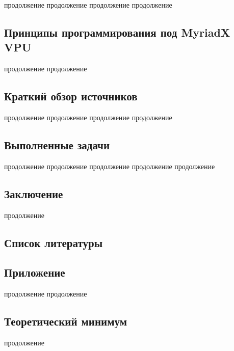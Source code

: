 \documentclass{article}
\begin{document}
    \newpage
    продолжение
    \newpage
    продолжение
    \newpage
    продолжение
    \newpage
    продолжение
    
    \newpage
    \begin{center} 
    \section{Принципы программирования под MyriadX VPU}
    \end{center}
    
    \newpage
    продолжение
    \newpage
    продолжение
    
    \newpage
    \begin{center} 
    \section{Краткий обзор источников}
    \end{center}
    
    \newpage
    продолжение
    \newpage
    продолжение
    \newpage
    продолжение
    \newpage
    продолжение
    
    \newpage
    \begin{center} 
    \section{Выполненные задачи}
    \end{center}
    
    \newpage
    продолжение
    \newpage
    продолжение
    \newpage
    продолжение
    \newpage
    продолжение
    \newpage
    продолжение
    
    \newpage
    \begin{center} 
    \section{Заключение}
    \end{center}
    
    \newpage
    продолжение
    
    \newpage
    \begin{center} 
    \section{Список литературы}
    \end{center}
    
    \newpage
    \begin{center} 
    \section{Приложение}
    \end{center}
    
    \newpage
    продолжение
    \newpage
    продолжение
    
    \newpage
    \begin{center} 
    \section{Теоретический минимум}
    \end{center}
    
    \newpage
    продолжение
    
    
\end{document}
